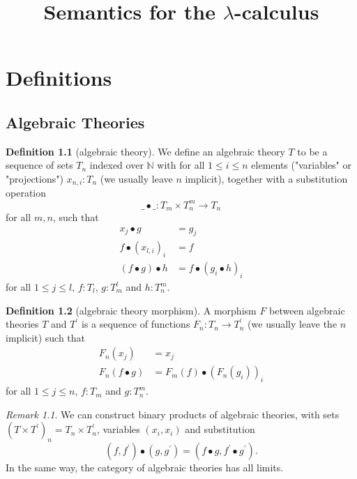 \documentclass[a4paper]{amsbook}
\title{Semantics for the $ \lambda $-calculus}
\theoremstyle{definition}
\newtheorem{definition}{Definition}
\theoremstyle{remark}
\newtheorem{remark}{Remark}
\begin{document}
  \maketitle

  \tableofcontents

  \chapter{Definitions}

  \section{Algebraic Theories}

  \begin{definition}[algebraic theory]
    We define an algebraic theory $ T $ to be a sequence of sets $ T_n $ indexed over $ \mathbb N $ with for all $ 1 \leq i \leq n $ elements ("variables" or "projections") $ x_{n, i}: T_n $ (we usually leave $ n $ implicit), together with a substitution operation
    \[ \_ \bullet \_: T_m \times T_n^m \to T_n \]
    for all $ m, n $, such that
    \begin{align*}
      x_j \bullet g &= g_j\\
      f \bullet (x_{l, i})_i &= f\\
      (f \bullet g) \bullet h &= f \bullet (g_i \bullet h)_i
    \end{align*}
    for all $ 1 \leq j \leq l $, $ f: T_l $, $ g: T_m^l $ and $ h: T_n^m $.
  \end{definition}

  \begin{definition}[algebraic theory morphism]
    A morphism $ F $ between algebraic theories $ T $ and $ T^\prime $ is a sequence of functions $ F_n: T_n \to T^\prime_n $ (we usually leave the $ n $ implicit) such that
    \begin{align*}
      F_n(x_j) &= x_j\\
      F_n(f \bullet g) &= F_m(f) \bullet (F_n(g_i))_i
    \end{align*}
    for all $ 1 \leq j \leq n $, $ f: T_m $ and $ g: T_n^m $.
  \end{definition}

  \begin{remark}
    We can construct binary products of algebraic theories, with sets $ (T \times T^\prime)_n = T_n \times T^\prime_n $, variables $ (x_i, x_i) $ and substitution
    \[ (f, f^\prime) \bullet (g, g^\prime) = (f \bullet g, f^\prime \bullet g^\prime). \]
    In the same way, the category of algebraic theories has all limits.
  \end{remark}
\end{document}
